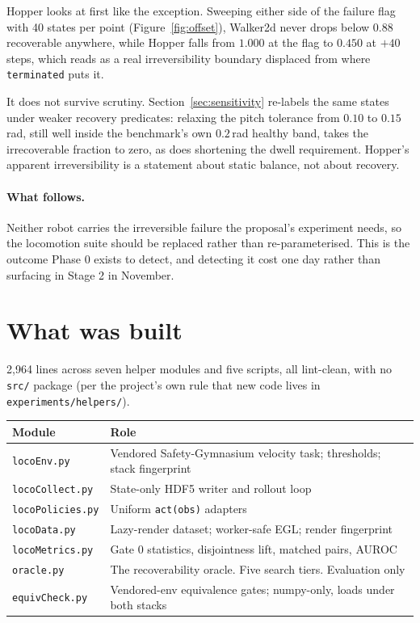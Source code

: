 \documentclass[11pt,a4paper]{article}
\begin{document}
Hopper looks at first like the exception. Sweeping either side of the failure flag with 40 states
per point (Figure~\ref{fig:offset}), Walker2d never drops below $0.88$ recoverable anywhere, while
Hopper falls from $1.000$ at the flag to $0.450$ at $+40$ steps, which reads as a real
irreversibility boundary displaced from where \texttt{terminated} puts it.

It does not survive scrutiny. Section~\ref{sec:sensitivity} re-labels the same states under
weaker recovery predicates: relaxing the pitch tolerance from $0.10$ to $0.15$\,rad, still well
inside the benchmark's own $0.2$\,rad healthy band, takes the irrecoverable fraction to zero, as
does shortening the dwell requirement. Hopper's apparent irreversibility is a statement about
static balance, not about recovery.

\paragraph{What follows.} Neither robot carries the irreversible failure the proposal's
experiment needs, so the locomotion suite should be replaced rather than re-parameterised. This is
the outcome Phase 0 exists to detect, and detecting it cost one day rather than surfacing in Stage
2 in November.

\section{What was built}

2{,}964 lines across seven helper modules and five scripts, all lint-clean, with no \texttt{src/}
package (per the project's own rule that new code lives in \texttt{experiments/helpers/}).

\begin{table}[H]
\centering
\small
\begin{tabular}{ll}
\toprule
Module & Role \\
\midrule
\texttt{locoEnv.py} & Vendored Safety-Gymnasium velocity task; thresholds; stack fingerprint \\
\texttt{locoCollect.py} & State-only HDF5 writer and rollout loop \\
\texttt{locoPolicies.py} & Uniform \texttt{act(obs)} adapters \\
\texttt{locoData.py} & Lazy-render dataset; worker-safe EGL; render fingerprint \\
\texttt{locoMetrics.py} & Gate 0 statistics, disjointness lift, matched pairs, AUROC \\
\texttt{oracle.py} & The recoverability oracle. Five search tiers. Evaluation only \\
\texttt{equivCheck.py} & Vendored-env equivalence gates; numpy-only, loads under both stacks \\
\bottomrule
\end{tabular}
\end{table}
\end{document}
